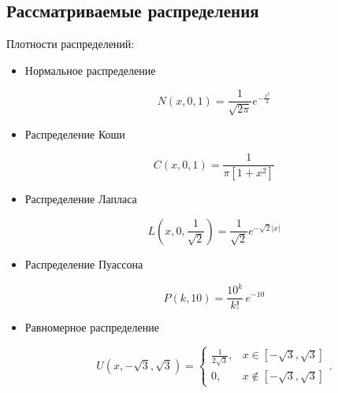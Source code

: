\subsection{Рассматриваемые распределения}
Плотности распределений:
\begin{itemize}
	\item{Нормальное распределение}
	
	\begin{equation}
		N(x, 0, 1) = \frac{1}{ \sqrt {2\pi } }e^{-\frac{{x}^2 }{2}}
	\end{equation}
	
	\item{Распределение Коши}
	
	\begin{equation}
		C(x, 0, 1) =  \frac{1}{\pi \left[1 + {x}^2\right]}
	\end{equation}
	
	\item{Распределение Лапласа}
	
	\begin{equation}
		L(x, 0, \frac{1}{\sqrt{2}}) =  \frac{1}{\sqrt{2}} {e}^{-\sqrt{2} |x|}
	\end{equation}
		
	\item{Распределение Пуассона}
	
	\begin{equation} 
		P(k, 10) = \frac{10^k}{k!}\, e^{-10}
	\end{equation}
	
	\item{Равномерное распределение}
	
	\begin{equation} 
		U(x, -\sqrt{3}, \sqrt{3}) = \left\{
		\begin{matrix}
			{\frac{1}{2\sqrt{3}}}, & x\in [-\sqrt{3},\sqrt{3}] \\
			0, & x\not\in [-\sqrt{3},\sqrt{3}]
		\end{matrix}
		\right..
	\end{equation}
	
\end{itemize}